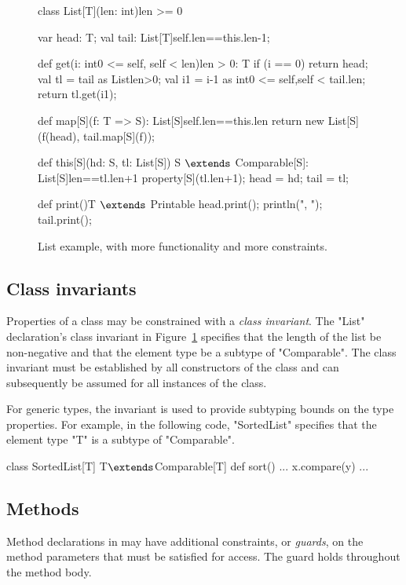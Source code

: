 \begin{figure}
{\footnotesize
\begin{xtenmathnoindent}
class List[T](len: int){len >= 0} {
  var head: T;
  val tail: List[T]{self.len==this.len-1};

  def get(i: int{0 <= self, self < len}){len > 0}: T {
    if (i == 0)
      return head;
    val tl = tail as List{len>0};
    val i1 = i-1 as int{0 <= self,self < tail.len};
    return tl.get(i1);
  }

  def map[S](f: T => S): List[S]{self.len==this.len} {
    return new List[S](f(head), tail.map[S](f));
  }

  def this[S](hd: S, tl: List[S])
      {S $\extends$ Comparable[S]}: List[S]{len==tl.len+1} {
    property[S](tl.len+1);
    head = hd; tail = tl;
  }

  def print(){T $\extends$ Printable} {
    head.print();
    println(", ");
    tail.print();
  }
}
\end{xtenmathnoindent}}
\caption{List example, with more functionality and more
constraints.}
\label{fig:list}
\end{figure}

\subsection{Class invariants}

Properties of a class may be constrained with 
a \emph{class invariant}.
The \xcd"List" declaration's class invariant in
Figure~\ref{fig:list} specifies that the length of
the list be non-negative and that the element type be
a subtype of \xcd"Comparable".
The class invariant must be established by all constructors of
the class and can subsequently be assumed for all instances of the class.

For generic types, the invariant is used to provide subtyping
bounds on the type properties.
For example, in the following code, \xcd"SortedList" 
specifies that the element type \xcd"T"
is a subtype of \xcd"Comparable".
\begin{xtenmath}
class SortedList[T] {T$\extends$Comparable[T]} {
  def sort() { ... x.compare(y) ... }
}
\end{xtenmath}

\subsection{Methods}

Method declarations in \Xten
may have additional
constraints, or \emph{guards}, on the method parameters
that must be satisfied for access.
The guard holds throughout the method body.

